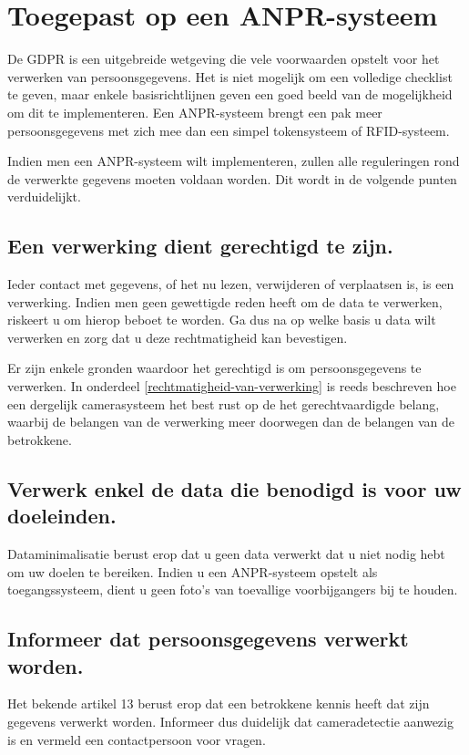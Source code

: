 \section{Toegepast op een ANPR-systeem}
De GDPR is een uitgebreide wetgeving die vele voorwaarden opstelt voor het verwerken van persoonsgegevens. Het is niet mogelijk om een volledige checklist te geven, maar enkele basisrichtlijnen geven een goed beeld van de mogelijkheid om dit te implementeren. Een ANPR-systeem brengt een pak meer persoonsgegevens met zich mee dan een simpel tokensysteem of RFID-systeem.

Indien men een ANPR-systeem wilt implementeren, zullen alle reguleringen rond de verwerkte gegevens moeten voldaan worden. Dit wordt in de volgende punten verduidelijkt.

\subsection{Een verwerking dient gerechtigd te zijn.}
Ieder contact met gegevens, of het nu lezen, verwijderen of verplaatsen is, is een verwerking. Indien men geen gewettigde reden heeft om de data te verwerken, riskeert u om hierop beboet te worden. Ga dus na op welke basis u data wilt verwerken en zorg dat u deze rechtmatigheid kan bevestigen.

Er zijn enkele gronden waardoor het gerechtigd is om persoonsgegevens te verwerken. In onderdeel \ref{rechtmatigheid-van-verwerking} is reeds beschreven hoe een dergelijk camerasysteem het best rust op de het gerechtvaardigde belang, waarbij de belangen van de verwerking meer doorwegen dan de belangen van de betrokkene. 

\subsection{Verwerk enkel de data die benodigd is voor uw doeleinden.}
Dataminimalisatie berust erop dat u geen data verwerkt dat u niet nodig hebt om uw doelen te bereiken. Indien u een ANPR-systeem opstelt als toegangssysteem, dient u geen foto's van toevallige voorbijgangers bij te houden.

\subsection{Informeer dat persoonsgegevens verwerkt worden.}
Het bekende artikel 13 berust erop dat een betrokkene kennis heeft dat zijn gegevens verwerkt worden. Informeer dus duidelijk dat cameradetectie aanwezig is en vermeld een contactpersoon voor vragen.

